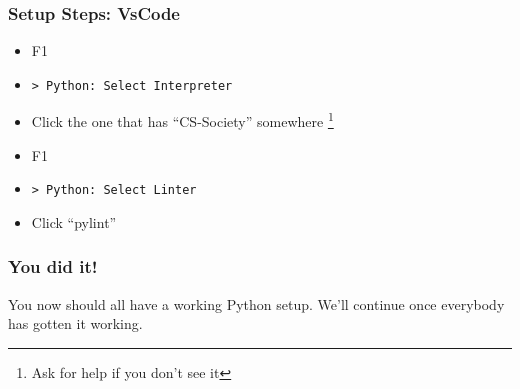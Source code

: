 \documentclass{beamer}
\begin{document}
\begin{frame}
  \frametitle{Setup Steps: VsCode}
  \begin{itemize}
    \item F1
    \item \texttt{> Python: Select Interpreter}
    \item Click the one that has ``CS-Society'' somewhere
    \footnote{Ask for help if you don't see it}
    \item F1
    \item \texttt{> Python: Select Linter}
    \item Click ``pylint''
  \end{itemize}
\end{frame}
\begin{frame}
  \frametitle{You did it!}
  You now should all have a working Python setup.  We'll continue once
  everybody has gotten it working.
\end{frame}
    
\end{document}
